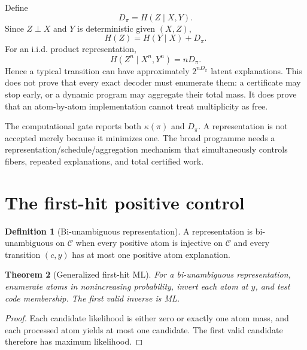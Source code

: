 \documentclass[11pt]{article}
\newtheorem{theorem}{Theorem}[section]
\theoremstyle{definition}
\newtheorem{definition}[theorem]{Definition}
\theoremstyle{remark}
\newcommand{\C}{\mathcal C}
\begin{document}
Define
\begin{equation}
 D_\pi=H(Z\mid X,Y).
 \label{eq:degeneracy}
\end{equation}
Since $Z\perp X$ and $Y$ is deterministic given $(X,Z)$,
\begin{equation}
 H(Z)=H(Y\mid X)+D_\pi.
 \label{eq:degidentity}
\end{equation}
For an i.i.d. product representation,
\begin{equation}
 H(Z^n\mid X^n,Y^n)=nD_\pi.
 \label{eq:degproduct}
\end{equation}
Hence a typical transition can have approximately $2^{nD_\pi}$ latent explanations. This does not prove that every exact decoder must enumerate them: a certificate may stop early, or a dynamic program may aggregate their total mass. It does prove that an atom-by-atom implementation cannot treat multiplicity as free.

\begin{gatebox}
The computational gate reports both $\kappa(\pi)$ and $D_\pi$. A representation is not accepted merely because it minimizes one. The broad programme needs a representation/schedule/aggregation mechanism that simultaneously controls fibers, repeated explanations, and total certified work.
\end{gatebox}

\section{The first-hit positive control}

\begin{definition}[Bi-unambiguous representation]
A representation is bi-unambiguous on $\C$ when every positive atom is injective on $\C$ and every transition $(c,y)$ has at most one positive atom explanation.
\end{definition}

\begin{theorem}[Generalized first-hit ML]
For a bi-unambiguous representation, enumerate atoms in nonincreasing probability, invert each atom at $y$, and test code membership. The first valid inverse is ML.
\end{theorem}

\begin{proof}
Each candidate likelihood is either zero or exactly one atom mass, and each processed atom yields at most one candidate. The first valid candidate therefore has maximum likelihood.
\end{proof}
\end{document}
